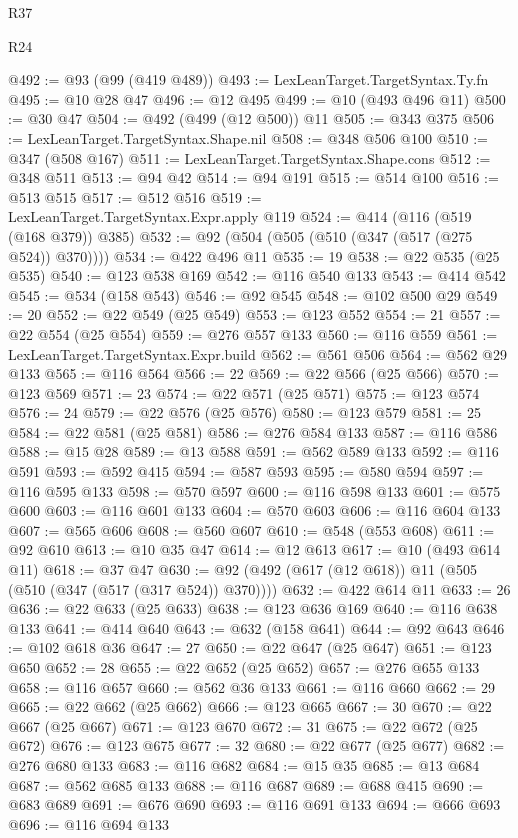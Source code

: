 \begin{lexlean}{R37}
\begin{lexlean}{R24}
\begin{coremodule}
{{{{{{{{{{{{{{{{{{{{{{{{{{{{{{{{{{{{{{{{{{{{{{{{{{{{{{{{{{{{{{{{{{{{{{{{{{{{{{{{{{{{{{{{{{{{{{{{{{{{{{{{{{{{{{{{{{{{{{{{{{{{{{{{{{{{{{{{{{{{{{{{{{{{{{{{{{{{{{{{{{{{{{{{{{{{{{{{{{{{{{{{{@492 := @93 (@99 (@419 @489))
@493 := LexLeanTarget.TargetSyntax.Ty.fn
@495 := @10 @28 @47
@496 := @12 @495
@499 := @10 (@493 @496 @11)
@500 := @30 @47
@504 := @492 (@499 (@12 @500)) @11
@505 := @343 @375
@506 := LexLeanTarget.TargetSyntax.Shape.nil
@508 := @348 @506 @100
@510 := @347 (@508 @167)
@511 := LexLeanTarget.TargetSyntax.Shape.cons
@512 := @348 @511
@513 := @94 @42
@514 := @94 @191
@515 := @514 @100
@516 := @513 @515
@517 := @512 @516
@519 := LexLeanTarget.TargetSyntax.Expr.apply @119
@524 := @414 (@116 (@519 (@168 @379)) @385)
@532 := @92 (@504 (@505 (@510 (@347 (@517 (@275 @524)) @370))))
@534 := @422 @496 @11
@535 := 19
@538 := @22 @535 (@25 @535)
@540 := @123 @538 @169
@542 := @116 @540 @133
@543 := @414 @542
@545 := @534 (@158 @543)
@546 := @92 @545
@548 := @102 @500 @29
@549 := 20
@552 := @22 @549 (@25 @549)
@553 := @123 @552
@554 := 21
@557 := @22 @554 (@25 @554)
@559 := @276 @557 @133
@560 := @116 @559
@561 := LexLeanTarget.TargetSyntax.Expr.build
@562 := @561 @506
@564 := @562 @29 @133
@565 := @116 @564
@566 := 22
@569 := @22 @566 (@25 @566)
@570 := @123 @569
@571 := 23
@574 := @22 @571 (@25 @571)
@575 := @123 @574
@576 := 24
@579 := @22 @576 (@25 @576)
@580 := @123 @579
@581 := 25
@584 := @22 @581 (@25 @581)
@586 := @276 @584 @133
@587 := @116 @586
@588 := @15 @28
@589 := @13 @588
@591 := @562 @589 @133
@592 := @116 @591
@593 := @592 @415
@594 := @587 @593
@595 := @580 @594
@597 := @116 @595 @133
@598 := @570 @597
@600 := @116 @598 @133
@601 := @575 @600
@603 := @116 @601 @133
@604 := @570 @603
@606 := @116 @604 @133
@607 := @565 @606
@608 := @560 @607
@610 := @548 (@553 @608)
@611 := @92 @610
@613 := @10 @35 @47
@614 := @12 @613
@617 := @10 (@493 @614 @11)
@618 := @37 @47
@630 := @92 (@492 (@617 (@12 @618)) @11 (@505 (@510 (@347 (@517 (@317 @524)) @370))))
@632 := @422 @614 @11
@633 := 26
@636 := @22 @633 (@25 @633)
@638 := @123 @636 @169
@640 := @116 @638 @133
@641 := @414 @640
@643 := @632 (@158 @641)
@644 := @92 @643
@646 := @102 @618 @36
@647 := 27
@650 := @22 @647 (@25 @647)
@651 := @123 @650
@652 := 28
@655 := @22 @652 (@25 @652)
@657 := @276 @655 @133
@658 := @116 @657
@660 := @562 @36 @133
@661 := @116 @660
@662 := 29
@665 := @22 @662 (@25 @662)
@666 := @123 @665
@667 := 30
@670 := @22 @667 (@25 @667)
@671 := @123 @670
@672 := 31
@675 := @22 @672 (@25 @672)
@676 := @123 @675
@677 := 32
@680 := @22 @677 (@25 @677)
@682 := @276 @680 @133
@683 := @116 @682
@684 := @15 @35
@685 := @13 @684
@687 := @562 @685 @133
@688 := @116 @687
@689 := @688 @415
@690 := @683 @689
@691 := @676 @690
@693 := @116 @691 @133
@694 := @666 @693
@696 := @116 @694 @133
}}}}}}}}}}}}}}}}}}}}}}}}}}}}}}}}}}}}}}}}}}}}}}}}}}}}}}}}}}}}}}}}}}}}}}}}}}}}}}}}}}}}}}}}}}}}}}}}}}}}}}}}}}}}}}}}}}}}}}}}}}}}}}}}}}}}}}}}}}}}}}}}}}}}}}}}}}}}}}}}}}}}}}}}}}}}}}}}}}}}}}}}}
\end{coremodule}
\end{lexlean}
\end{lexlean}
